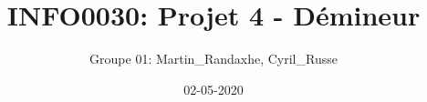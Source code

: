 \documentclass[a4paper, 11pt, oneside]{article}
\begin{document}

\title{INFO0030: Projet 4 - Démineur}
\author{Groupe 01: Martin\_Randaxhe, Cyril\_Russe}
\date{02-05-2020}

\maketitle
\end{document}
